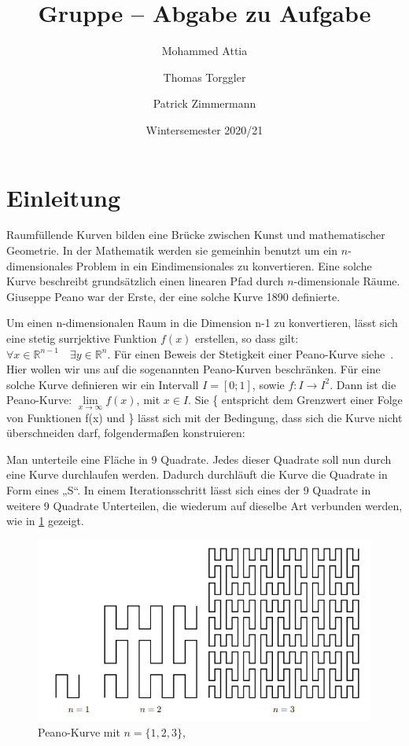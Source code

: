 \documentclass[course=asp]{aspdoc}
\author{Mohammed Attia \and Thomas Torggler \and Patrick Zimmermann}
\date{Wintersemester 2020/21} %
\title{Gruppe \theGroup{} -- Abgabe zu Aufgabe \theNumber}
\begin{document}
\maketitle

\newpage
\section{Einleitung} \label{Einleitung}

Raumf\"ullende Kurven bilden eine Br\"ucke zwischen Kunst und mathematischer Geometrie. In der Mathematik werden sie gemeinhin benutzt um ein $n$-dimensionales Problem in ein Eindimensionales zu konvertieren. Eine solche Kurve beschreibt grunds\"atzlich einen linearen Pfad durch $n$-dimensionale R\"aume. Giuseppe Peano war der Erste, der eine solche Kurve 1890 definierte.

Um einen n-dimensionalen Raum in die Dimension n-1 zu konvertieren, l\"asst sich eine stetig surrjektive Funktion $f(x)$ erstellen, so dass gilt: $\forall x \in \mathbb{R}^{n-1} \quad \exists y \in \mathbb{R}^n$. F\"ur einen Beweis der Stetigkeit einer Peano-Kurve siehe~\cite{stetigkeitsBeweis}. Hier wollen wir uns auf die sogenannten Peano-Kurven beschr\"anken. F\"ur eine solche Kurve definieren wir ein Intervall $I = [0;1]$, sowie  $f: I \rightarrow I^2 $. Dann ist die Peano-Kurve: $\lim\limits_{x \to \infty}f(x)$, mit $x \in I$. Sie \{ entspricht dem Grenzwert einer Folge von Funktionen f(x) und \} l\"asst sich mit der Bedingung, dass sich die Kurve nicht \"uberschneiden darf, folgendermaßen konstruieren:

Man unterteile eine Fl\"ache in 9 Quadrate. Jedes dieser Quadrate soll nun durch eine Kurve durchlaufen werden. Dadurch durchl\"auft die Kurve die Quadrate in Form eines „S“.
In einem Iterationsschritt l\"asst sich eines der 9 Quadrate in weitere 9 Quadrate Unterteilen, die wiederum auf dieselbe Art verbunden werden, wie in \ref{Abb:Peano} gezeigt.

\begin{figure} [ht] %
\centering
\includegraphics[scale=0.9]{PeanoBsp.png}
\caption{Peano-Kurve mit $n = \{1, 2, 3\}$, ~\cite{aufgabenstellung}}\label{Abb:Peano}
\end{figure}
\end{document}
